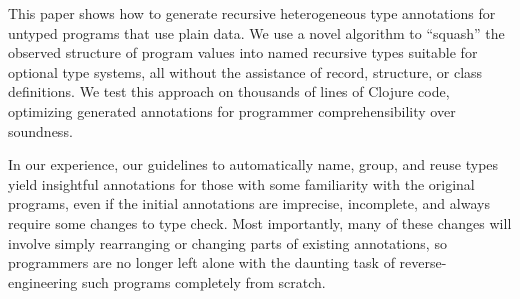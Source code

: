 
This paper shows how to
generate recursive heterogeneous type annotations for
untyped programs that use plain data.
We use a novel algorithm to ``squash'' the observed structure
of program values into named recursive types suitable for
optional type systems,
all without the assistance of record, structure, or class
definitions.
We test this approach on thousands of lines of Clojure code,
optimizing generated annotations
for programmer comprehensibility over soundness.

In our experience, our guidelines
to automatically name, group, and reuse
types yield insightful annotations
for those with some familiarity with
the original programs,
even if the initial annotations are imprecise, incomplete,
and always require some changes to type check.
Most importantly, many of these changes will involve simply rearranging or changing parts
of existing annotations, so programmers are no longer left alone
with the daunting task of reverse-engineering such programs
completely from scratch.


%
%
%
%
%
